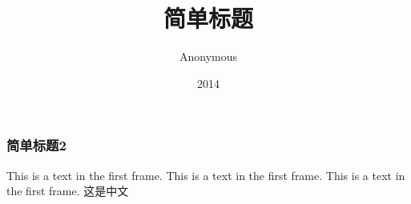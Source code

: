 \documentclass{beamer}
\title{简单标题}
\author{Anonymous}
\institute{Overleaf}
\date{2014}
\begin{document}
\begin{CJK*}{UTF8}{gbsn} 
  
  \frame{\titlepage}
  
  \begin{frame}
    \frametitle{简单标题2}
    This is a text in the first frame. This is a text in the first frame. This is a text in the first frame.
    这是中文
  \end{frame}
  
\end{CJK*} 
\end{document}
